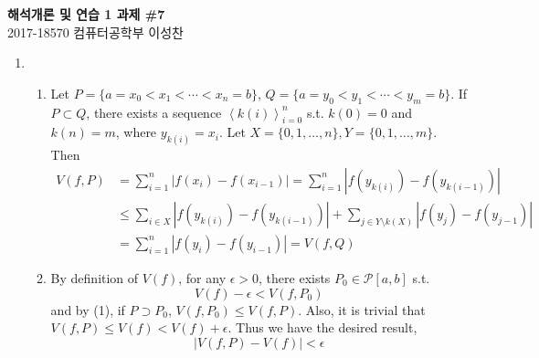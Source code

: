 \documentclass[11pt]{report}
\newcommand{\mc}[1]{\mathcal{#1}}
\renewcommand{\span}[1]{\left\langle #1 \right\rangle}
\newcommand{\abs}[1]{\left|#1\right|}
\newcommand{\bs}{\setminus}
\begin{document}
\begin{center}
\textbf{\Large 해석개론 및 연습 1 과제 \#7}\\
\large 2017-18570 컴퓨터공학부 이성찬
\end{center}
\begin{enumerate}
\item
\begin{enumerate}
	\item Let $P = \{a = x_0 < x_1 < \cdots  < x_n = b\}$, $Q = \{a = y_0 < y_1 < \cdots < y_m = b\}$. If $P\subset Q$, there exists a sequence $\span{k(i)}_{i=0}^n$ s.t. $k(0) = 0$ and $k(n) = m$, where $y_{k(i)} = x_i$. Let $X = \{0,1, \dots, n\}, Y = \{0, 1, \dots, m\}$. Then
	$$\begin{aligned}
	V(f, P) &= \sum_{i=1}^{n} \abs{f(x_{i})-f(x_{i-1})}=\sum_{i=1}^n \abs{f(y_{k(i)}) - f(y_{k(i-1)})}\\
	&\leq \sum_{i\in X} \abs{f(y_{k(i)}) - f(y_{k(i-1)})} + \sum_{j \in Y\bs k(X)} \abs{f(y_j) - f(y_{j-1})}\\
	&=\sum_{i=1}^n \abs{f(y_i) - f(y_{i-1})} = V(f, Q)
	\end{aligned}$$
	\item By definition of $V(f)$, for any $\epsilon > 0$, there exists $P_0\in \mc{P}[a, b]$ s.t.
	$$V(f)-\epsilon < V(f, P_0)$$
	and by (1), if $P\supset P_0$, $V(f, P_0) \leq V(f, P)$. Also, it is trivial that $V(f, P)\leq V(f) < V(f) + \epsilon$. Thus we have the desired result,
	$$\abs{V(f, P) - V(f)} < \epsilon$$
\end{enumerate}


\end{enumerate}
\end{document}
